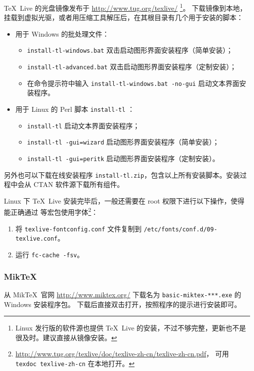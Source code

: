 \TeX\ Live 的光盘镜像发布于 \url{http://www.tug.org/texlive/}%
\footnote{Linux 发行版的软件源也提供 \TeX\ Live 的安装，不过不够完整，更新也不是很及时。建议直接从镜像安装。}。
下载镜像到本地，挂载到虚拟光驱，或者用压缩工具解压后，在其根目录有几个用于安装的脚本：
\begin{itemize}
  \item 用于 Windows 的批处理文件：
  \begin{itemize}
    \item \texttt{install-tl-windows.bat} 双击启动图形界面安装程序（简单安装）；
    \item \texttt{install-tl-advanced.bat} 双击启动图形界面安装程序（定制安装）；
    \item 在命令提示符中输入 \texttt{install-tl-windows.bat -no-gui} 启动文本界面安装程序。
  \end{itemize}
  \item 用于 Linux 的 Perl 脚本 \texttt{install-tl} ：
  \begin{itemize}
    \item \texttt{install-tl} 启动文本界面安装程序；
    \item \texttt{install-tl -gui=wizard} 启动图形界面安装程序（简单安装）；
    \item \texttt{install-tl -gui=peritk} 启动图形界面安装程序（定制安装）。
  \end{itemize}
\end{itemize}
另外也可以下载在线安装程序 \texttt{install-tl.zip}，包含以上所有安装脚本。安装过程中会从 CTAN 软件源下载所有组件。

Linux 下 \TeX\ Live 安装完毕后，一般还需要在 root 权限下进行以下操作，使得  能正确通过 
等宏包使用字体\footnote{\url{http://www.tug.org/texlive/doc/texlive-zh-cn/texlive-zh-cn.pdf}，%
可用 \texttt{texdoc texlive-zh-cn} 在本地打开。}：
\begin{enumerate}
  \item 将 \texttt{texlive-fontconfig.conf} 文件复制到 \texttt{/etc/fonts/conf.d/09-texlive.conf}。
  \item 运行 \texttt{fc-cache -fsv}。
\end{enumerate}

\subsubsection{Mik\TeX}
从 Mik\TeX\ 官网 \url{http://www.miktex.org/} 下载名为 \texttt{basic-miktex-***.exe} 的 Windows 安装程序包。
下载后直接双击打开，按照程序的提示进行安装即可。

